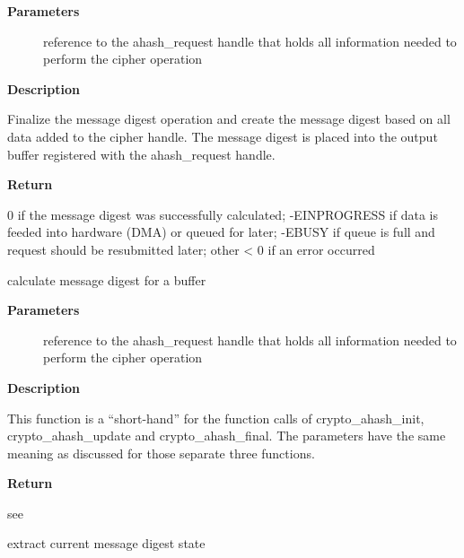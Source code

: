 \documentclass[a4paper,8pt,english]{sphinxmanual}
\begin{document}
\textbf{Parameters}
\begin{description}
\item[{}] \leavevmode
reference to the ahash\_request handle that holds all information
needed to perform the cipher operation

\end{description}

\textbf{Description}

Finalize the message digest operation and create the message digest
based on all data added to the cipher handle. The message digest is placed
into the output buffer registered with the ahash\_request handle.

\textbf{Return}

0            if the message digest was successfully calculated;
-EINPROGRESS if data is feeded into hardware (DMA) or queued for later;
-EBUSY       if queue is full and request should be resubmitted later;
other \textless{} 0    if an error occurred

\begin{fulllineitems}
\label{crypto/api-digest:c.crypto_ahash_digest}
calculate message digest for a buffer

\end{fulllineitems}


\textbf{Parameters}
\begin{description}
\item[{}] \leavevmode
reference to the ahash\_request handle that holds all information
needed to perform the cipher operation

\end{description}

\textbf{Description}

This function is a ``short-hand'' for the function calls of crypto\_ahash\_init,
crypto\_ahash\_update and crypto\_ahash\_final. The parameters have the same
meaning as discussed for those separate three functions.

\textbf{Return}

see {\hyperref[crypto/api\string-digest:c.crypto_ahash_final]{\emph{}}}

\begin{fulllineitems}
\label{crypto/api-digest:c.crypto_ahash_export}
extract current message digest state

\end{fulllineitems}
\end{document}
